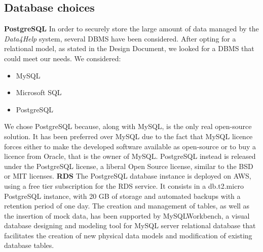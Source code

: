 \documentclass[titlepage]{article}
\begin{document}
	\subsection{Database choices}
	{\bf PostgreSQL} \newline
	In order to securely store the large amount of data managed by the {\it Data4Help} system, several DBMS have been considered.
	\noindent
	After opting for a relational model, as stated in the Design Document, we looked for a DBMS that could meet our needs. We considered:
	\begin{itemize}
		\item {MySQL}
		\item{Microsoft SQL}
		\item{PostgreSQL}
	\end{itemize}
	We chose PostgreSQL because, along with MySQL, is the only real open-source solution. It has been preferred over MySQL due to the fact that MySQL licence forces either to make the developed software available as open-source or to buy a licence from Oracle, that is the owner of MySQL. PostgreSQL instead  is released under the PostgreSQL license, a liberal Open Source license, similar to the BSD or MIT licenses.
	\newline
	\newline
	\noindent
	{\bf RDS} \newline
	The PostgreSQL database instance is deployed on AWS, using a free tier subscription for the RDS service. It consists in a db.t2.micro PostgreSQL instance, with 20 GB of storage and automated backups with a retention period of one day. 
	The creation and management of tables, as well as the insertion of mock data, has been supported by MySQLWorkbench, a visual database designing and modeling tool for MySQL server relational database that facilitates the creation of new physical data models and modification of existing database tables.
	
	
\end{document}
